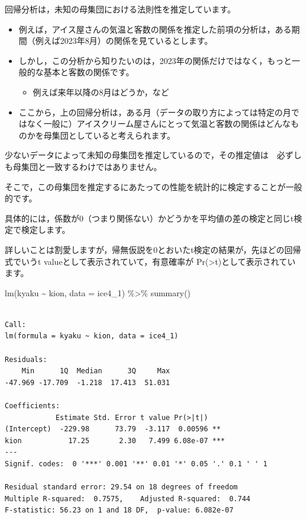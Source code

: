 \documentclass[
  letterpaper,
  DIV=11,
  numbers=noendperiod]{scrreprt}
\newenvironment{Shaded}{\begin{snugshade}}{\end{snugshade}}
\newcommand{\AttributeTok}[1]{\textcolor[rgb]{0.40,0.45,0.13}{#1}}
\newcommand{\FunctionTok}[1]{\textcolor[rgb]{0.28,0.35,0.67}{#1}}
\newcommand{\NormalTok}[1]{\textcolor[rgb]{0.00,0.23,0.31}{#1}}
\newcommand{\SpecialCharTok}[1]{\textcolor[rgb]{0.37,0.37,0.37}{#1}}
\providecommand{\tightlist}{%
  \setlength{\itemsep}{0pt}\setlength{\parskip}{0pt}}\usepackage{longtable,booktabs,array}
\begin{document}
回帰分析は，未知の母集団における法則性を推定しています。

\begin{itemize}
\tightlist
\item
  例えば，アイス屋さんの気温と客数の関係を推定した前項の分析は，ある期間（例えば2023年8月）の関係を見ているとします。
\item
  しかし，この分析から知りたいのは，2023年の関係だけではなく，もっと一般的な基本と客数の関係です。

  \begin{itemize}
  \tightlist
  \item
    例えば来年以降の8月はどうか，など
  \end{itemize}
\item
  ここから，上の回帰分析は，ある月（データの取り方によっては特定の月ではなく一般に）アイスクリーム屋さんにとって気温と客数の関係はどんなものかを母集団としていると考えられます。
\end{itemize}

少ないデータによって未知の母集団を推定しているので，その推定値は　必ずしも母集団と一致するわけではありません。

そこで，この母集団を推定するにあたっての性能を統計的に検定することが一般的です。

具体的には，係数が0（つまり関係ない）かどうかを平均値の差の検定と同じt検定で検定します。

詳しいことは割愛しますが，帰無仮説を0とおいたt検定の結果が，先ほどの回帰式でいうt
valueとして表示されていて，有意確率が
Pr(\textgreater\textbar t\textbar)として表示されています。

\begin{Shaded}
\begin{Highlighting}[]
\FunctionTok{lm}\NormalTok{(kyaku }\SpecialCharTok{\textasciitilde{}}\NormalTok{ kion, }\AttributeTok{data =}\NormalTok{ ice4\_1) }\SpecialCharTok{\%\textgreater{}\%} 
  \FunctionTok{summary}\NormalTok{()}
\end{Highlighting}
\end{Shaded}

\begin{verbatim}

Call:
lm(formula = kyaku ~ kion, data = ice4_1)

Residuals:
    Min      1Q  Median      3Q     Max 
-47.969 -17.709  -1.218  17.413  51.031 

Coefficients:
            Estimate Std. Error t value Pr(>|t|)    
(Intercept)  -229.98      73.79  -3.117  0.00596 ** 
kion           17.25       2.30   7.499 6.08e-07 ***
---
Signif. codes:  0 '***' 0.001 '**' 0.01 '*' 0.05 '.' 0.1 ' ' 1

Residual standard error: 29.54 on 18 degrees of freedom
Multiple R-squared:  0.7575,    Adjusted R-squared:  0.744 
F-statistic: 56.23 on 1 and 18 DF,  p-value: 6.082e-07
\end{verbatim}
\end{document}
